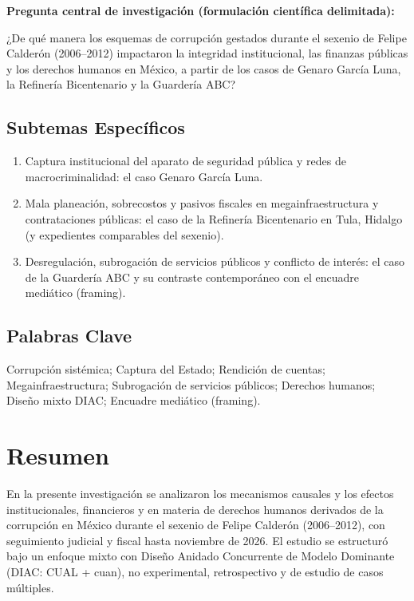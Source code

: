 \documentclass[12pt,letterpaper,oneside]{article}
\begin{document}
\textbf{Pregunta central de investigación (formulación científica delimitada):}

¿De qué manera los esquemas de corrupción gestados durante el sexenio de Felipe Calderón (2006--2012) impactaron la integridad institucional, las finanzas públicas y los derechos humanos en México, a partir de los casos de Genaro García Luna, la Refinería Bicentenario y la Guardería ABC?

\subsection*{Subtemas Específicos}

\begin{enumerate}
  \item Captura institucional del aparato de seguridad pública y redes de macrocriminalidad: el caso Genaro García Luna.
  \item Mala planeación, sobrecostos y pasivos fiscales en megainfraestructura y contrataciones públicas: el caso de la Refinería Bicentenario en Tula, Hidalgo (y expedientes comparables del sexenio).
  \item Desregulación, subrogación de servicios públicos y conflicto de interés: el caso de la Guardería ABC y su contraste contemporáneo con el encuadre mediático (framing).
\end{enumerate}

\subsection*{Palabras Clave}

Corrupción sistémica; Captura del Estado; Rendición de cuentas; Megainfraestructura; Subrogación de servicios públicos; Derechos humanos; Diseño mixto DIAC; Encuadre mediático (framing).

\clearpage


\section*{Resumen}

En la presente investigación se analizaron los mecanismos causales y los efectos institucionales, financieros y en materia de derechos humanos derivados de la corrupción en México durante el sexenio de Felipe Calderón (2006--2012), con seguimiento judicial y fiscal hasta noviembre de 2026. El estudio se estructuró bajo un enfoque mixto con Diseño Anidado Concurrente de Modelo Dominante (DIAC: CUAL + cuan), no experimental, retrospectivo y de estudio de casos múltiples.
\end{document}
